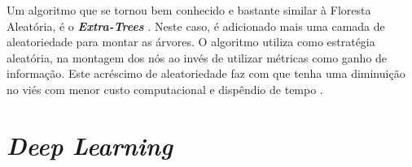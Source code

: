 \documentclass[
  openany]{book}
\begin{document}
Um algoritmo que se tornou bem conhecido e bastante similar à Floresta Aleatória, é o \textbf{\emph{Extra-Trees}} \citep{geurts2006extremely}. Neste caso, é adicionado mais uma camada de aleatoriedade para montar as árvores. O algoritmo utiliza como estratégia aleatória, na montagem dos nós ao invés de utilizar métricas como ganho de informação. Este acréscimo de aleatoriedade faz com que tenha uma diminuição no viés com menor custo computacional e dispêndio de tempo \citep{machado2020avaliaccao}.

\hypertarget{deeplearning}{%
\chapter{\texorpdfstring{\emph{Deep Learning}}{Deep Learning}}\label{deeplearning}}

  
\end{document}
